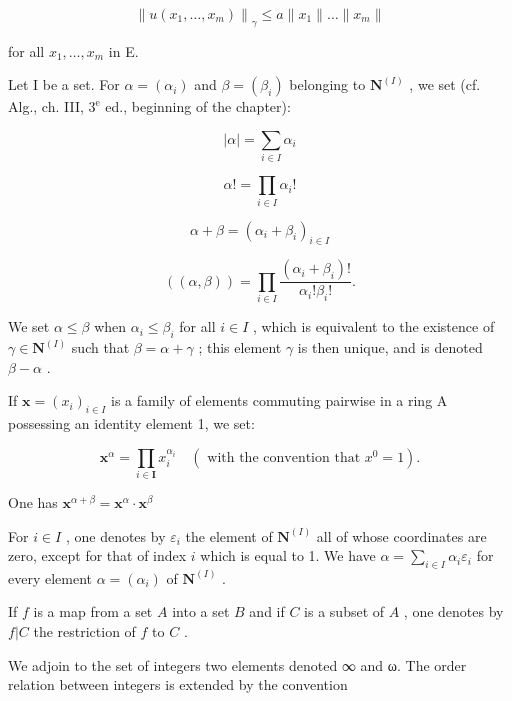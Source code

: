 \[
\left\| u (x _ {1}, \dots , x _ {m}) \right\| _ {\gamma} \leqslant a \| x _ {1} \| \dots \| x _ {m} \|
\]

for all \(x_{1}, \ldots, x_{m}\) in E.


Let I be a set. For \(\alpha = (\alpha_{i})\) and \(\beta = (\beta_{i})\) belonging to \(\mathbf{N}^{(I)}\) , we set (cf. Alg., ch. III, \(3^{\mathrm{e}}\) ed., beginning of the chapter):

\[
| \alpha | = \sum_ {i \in I} \alpha_ {i}
\]

\[
\alpha ! = \prod_ {i \in I} \alpha_ {i}!
\]

\[
\alpha + \beta = (\alpha_ {i} + \beta_ {i}) _ {i \in I}
\]

\[
((\alpha , \beta)) = \prod_ {i \in I} \frac {(\alpha_ {i} + \beta_ {i}) !}{\alpha_ {i} ! \beta_ {i} !}.
\]

We set \(\alpha \leqslant \beta\) when \(\alpha_{i} \leqslant \beta_{i}\) for all \(i \in I\) , which is equivalent to the existence of \(\gamma \in \mathbf{N}^{(I)}\) such that \(\beta = \alpha + \gamma\) ; this element \(\gamma\) is then unique, and is denoted \(\beta - \alpha\) .

If \(\mathbf{x} = (x_i)_{i \in I}\) is a family of elements commuting pairwise in a ring A possessing an identity element 1, we set:

\[
\mathbf {x} ^ {\alpha} = \prod_ {i \in \mathbf {I}} x _ {i} ^ {\alpha_ {i}} \quad (\text { with   the   convention   that } x ^ {0} = 1).
\]

One has \(\mathbf{x}^{\alpha +\beta} = \mathbf{x}^{\alpha}\cdot \mathbf{x}^{\beta}\)

For \(i\in I\) , one denotes by \(\varepsilon_{i}\) the element of \(\mathbf{N}^{(I)}\) all of whose coordinates are zero, except for that of index \(i\) which is equal to 1. We have \(\alpha=\sum_{i\in I}\alpha_{i}\varepsilon_{i}\) for every element \(\alpha=(\alpha_{i})\) of \(\mathbf{N}^{(I)}\) .


If \(f\) is a map from a set \(A\) into a set \(B\) and if \(C\) is a subset of \(A\) , one denotes by \(f|C\) the restriction of \(f\) to \(C\) .


We adjoin to the set of integers two elements denoted ∞ and ω. The order relation between integers is extended by the convention

